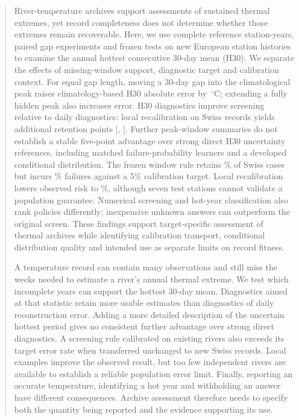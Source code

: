 \documentclass[draft]{agujournal2025}
\begin{document}
\begin{abstract}
River-temperature archives support assessments of sustained thermal extremes, yet record completeness does not determine whether those extremes remain recoverable. Here, we use \RSourceYears{} complete reference station-years, paired gap experiments and frozen tests on new European station histories to examine the annual hottest consecutive 30-day mean (H30). We separate the effects of missing-window support, diagnostic target and calibration context. For equal gap length, moving a 30-day gap into the climatological peak raises climatology-based H30 absolute error by \RPosition{}\,$^{\circ}$C; extending a fully hidden peak also increases error. H30 diagnostics improve screening relative to daily diagnostics: local recalibration on Swiss records yields \RTestRetTargetDailyGain{} additional retention points [\RTestRetTargetDailyLow{}, \RTestRetTargetDailyHigh{}]. Further peak-window summaries do not establish a stable five-point advantage over strong direct H30 uncertainty references, including matched failure-probability learners and a developed conditional distribution. The frozen window rule retains \RTestRetFrozenRetention{}\% of \RTestRetCases{} Swiss cases but incurs \RTestRetFrozenRisk{}\% failures against a 5\% calibration target. Local recalibration lowers observed risk to \RTestRetRecalibratedRisk{}\%, although seven test stations cannot validate a population guarantee. Numerical screening and hot-year classification also rank policies differently; inexpensive unknown answers can outperform the original screen. These findings support target-specific assessment of thermal archives while identifying calibration transport, conditional distribution quality and intended use as separate limits on record fitness.
\begin{plainlanguagesummary}
A temperature record can contain many observations and still miss the weeks needed to estimate a river's annual thermal extreme. We test which incomplete years can support the hottest 30-day mean. Diagnostics aimed at that statistic retain more usable estimates than diagnostics of daily reconstruction error. Adding a more detailed description of the uncertain hottest period gives no consistent further advantage over strong direct diagnostics. A screening rule calibrated on existing rivers also exceeds its target error rate when transferred unchanged to new Swiss records. Local examples improve the observed result, but too few independent rivers are available to establish a reliable population error limit. Finally, reporting an accurate temperature, identifying a hot year and withholding an answer have different consequences. Archive assessment therefore needs to specify both the quantity being reported and the evidence supporting its use.
\end{plainlanguagesummary}
\end{abstract}
\end{document}
